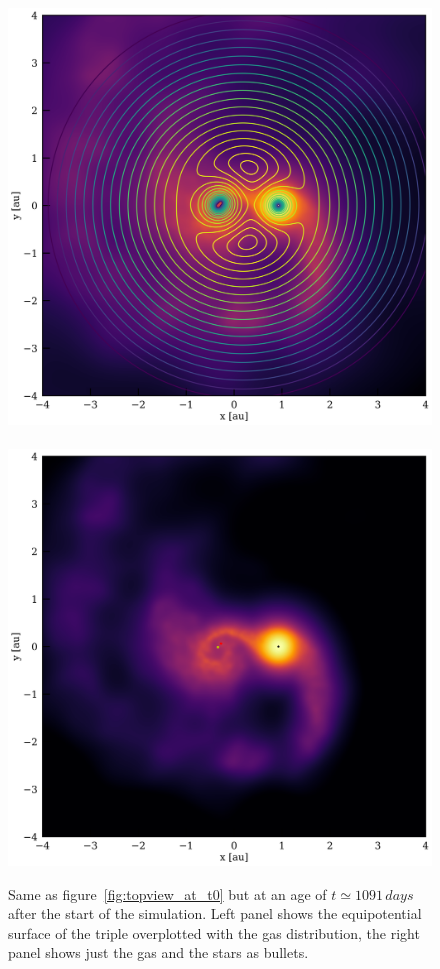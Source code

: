 \documentclass{aastex62}
\begin{document}
\begin{figure}[ht!]
  \includegraphics[width=0.49\columnwidth]{fig_BBSS_Lgas_M14Msun_A010au_t3360.pdf}
~  \includegraphics[width=0.51\columnwidth]{fig_BBSS_gas_M14Msun_A010au_t3360.pdf}
\caption{Same as figure~\ref{fig:topview_at_t0} but at an age of $t
  \simeq 1091\,days$ after the start of the simulation. Left panel
  shows the equipotential surface of the triple overplotted with the
  gas distribution, the right panel shows just the gas and the stars
  as bullets.
\label{fig:topview_at_t1000day}}
\end{figure}
\end{document}
